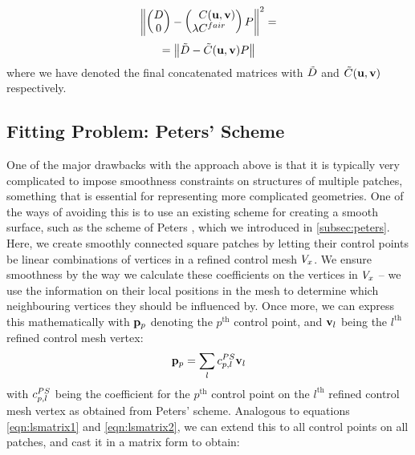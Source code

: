 \begin{equation*}
\norm{
\begin{pmatrix}
\lsDataPointMatrix \\ 0
\end{pmatrix} -
\begin{pmatrix*}[l]
\phantom{\lambda}\lsControlPointCoefMatrix(\vec{u},\vec{v}) \\ \lambda \lsControlPointCoefMatrix^{fair}
\end{pmatrix*}
\lsControlPointMatrix 
}^2 =
\end{equation*}
\begin{equation}
\label{eq:lsconcatmat}
= \norm{\lsDataPointConcMatrix - \lsControlCoefConcMatrix(\vec{u},\vec{v}) \lsControlPointMatrix }
\end{equation}
where we have denoted the final concatenated matrices with $\lsDataPointConcMatrix$ and $ \lsControlCoefConcMatrix(\vec{u},\vec{v})$ respectively.

\subsection{Fitting Problem: Peters' Scheme}
\label{subsub:petersleastsq}
One of the major drawbacks with the approach above is that it is typically very complicated to impose smoothness constraints on structures of multiple patches, something that is essential for representing more complicated geometries. One of the ways of avoiding this is to use an existing scheme for creating a smooth surface, such as the scheme of Peters \cite{peters1992constructing,eck1996automatic}, which we introduced in \autoref{subsec:peters}. Here, we create smoothly connected square \Bez patches by letting their control points be linear combinations of vertices in a refined control mesh $\petersPatchPoints$. We ensure smoothness by the way we calculate these coefficients on the vertices in $\petersPatchPoints$ -- we use the information on their local positions in the mesh to determine which neighbouring vertices they should be influenced by. Once more, we can express this mathematically with $\lsControlPointi{p}$ denoting the $p^\text{th}$ control point, and $\petersPatchPointVec_l$ being the $l^\text{th}$ refined control mesh vertex:
\begin{equation}
\lsControlPointi{p} = \sum\limits_{l} \petersControlPointCoef_{p,l} \petersPatchPointVec_l
\end{equation} 
with $\petersControlPointCoef_{p,l}$ being the coefficient for the $p^\text{th}$ \Bez control point on the $l^\text{th}$ refined control mesh vertex as obtained from Peters' scheme. Analogous to equations \ref{eqn:lsmatrix1} and \ref{eqn:lsmatrix2}, we can extend this to all \Bez control points on all patches, and cast it in a matrix form to obtain:

